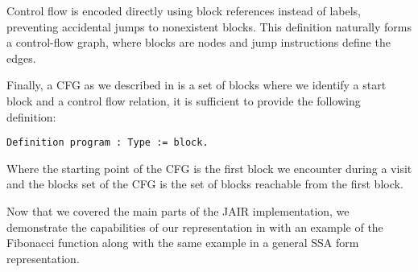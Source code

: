 Control flow is encoded directly using block references instead of labels, preventing accidental jumps to nonexistent blocks. This definition naturally forms a control-flow graph, where blocks are nodes and jump instructions define the edges.

Finally, a CFG as we described in  is a set of blocks where we identify a start block and a control flow relation, it is sufficient to provide the following definition:

\begin{lstlisting}[style=Coq]
Definition program : Type := block.
\end{lstlisting}

Where the starting point of the CFG is the first block we encounter during a visit and the blocks set of the CFG is the set of blocks reachable from the first block.

Now that we covered the main parts of the JAIR implementation, we demonstrate the capabilities of our representation in  with an example of the Fibonacci function along with the same example in a general SSA form representation.

